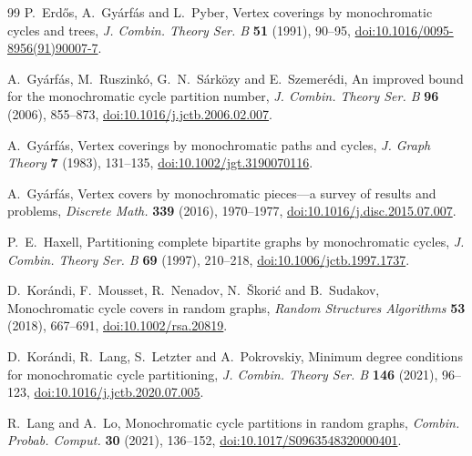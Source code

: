 \documentclass[a4paper,12pt,reqno]{amsart}
\begin{document}
\begin{thebibliography}{99}
P.~Erd\H{o}s, A.~Gy\'arf\'as and L.~Pyber,
\newblock Vertex coverings by monochromatic cycles and trees,
\newblock \emph{J. Combin. Theory Ser. B} \textbf{51} (1991), 90--95,
\newblock \href{https://doi.org/10.1016/0095-8956(91)90007-7}{doi:10.1016/0095-8956(91)90007-7}.

A.~Gy\'arf\'as, M.~Ruszink\'o, G.~N.~S\'ark\"ozy and E.~Szemer\'edi,
\newblock An improved bound for the monochromatic cycle partition number,
\newblock \emph{J. Combin. Theory Ser. B} \textbf{96} (2006), 855--873,
\newblock \href{https://doi.org/10.1016/j.jctb.2006.02.007}{doi:10.1016/j.jctb.2006.02.007}.


A.~Gy\'arf\'as,
\newblock Vertex coverings by monochromatic paths and cycles,
\newblock \emph{J. Graph Theory} \textbf{7} (1983), 131--135,
\newblock \href{https://doi.org/10.1002/jgt.3190070116}{doi:10.1002/jgt.3190070116}.

A.~Gy\'arf\'as,
\newblock Vertex covers by monochromatic pieces---a survey of results and
  problems,
\newblock \emph{Discrete Math.} \textbf{339} (2016), 1970--1977,
\newblock \href{https://doi.org/10.1016/j.disc.2015.07.007}{doi:10.1016/j.disc.2015.07.007}.

P.~E.~Haxell,
\newblock Partitioning complete bipartite graphs by monochromatic cycles,
\newblock \emph{J. Combin. Theory Ser. B} \textbf{69} (1997), 210--218,
\newblock \href{https://doi.org/10.1006/jctb.1997.1737}{doi:10.1006/jctb.1997.1737}.

D.~Kor\'andi, F.~Mousset, R.~Nenadov, N.~\v{S}kori\'c and B.~Sudakov,
\newblock Monochromatic cycle covers in random graphs,
\newblock \emph{Random Structures Algorithms} \textbf{53} (2018), 667--691,
\newblock \href{https://doi.org/10.1002/rsa.20819}{doi:10.1002/rsa.20819}.

D.~Kor\'andi, R.~Lang, S.~Letzter and A.~Pokrovskiy,
\newblock Minimum degree conditions for monochromatic cycle partitioning,
\newblock \emph{J. Combin. Theory Ser. B} \textbf{146} (2021), 96--123,
\newblock \href{https://doi.org/10.1016/j.jctb.2020.07.005}{doi:10.1016/j.jctb.2020.07.005}.

R.~Lang and A.~Lo,
\newblock Monochromatic cycle partitions in random graphs,
\newblock \emph{Combin. Probab. Comput.} \textbf{30} (2021), 136--152,
\newblock \href{https://doi.org/10.1017/S0963548320000401}{doi:10.1017/S0963548320000401}.


\end{thebibliography}
\end{document}
